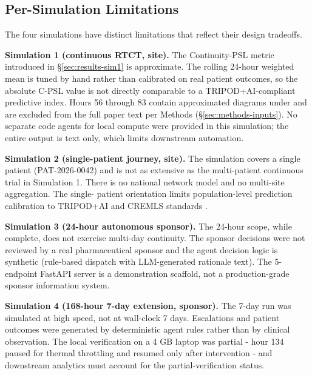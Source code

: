 
\subsection{Per-Simulation Limitations}
\label{sec:limits-per-sim}

The four simulations have distinct limitations that reflect their
design tradeoffs.

\textbf{Simulation 1 (continuous RTCT, site).} The Continuity-PSL
metric introduced in \S\ref{sec:results-sim1} is approximate. The
rolling 24-hour weighted mean is tuned by hand rather than calibrated
on real patient outcomes, so the absolute C-PSL value is not directly
comparable to a TRIPOD+AI-compliant predictive index. Hours 56
through 83 contain approximated diagrams under 
and are excluded from the full paper text per Methods
(\S\ref{sec:methods-inputs}). No separate code agents for local
compute were provided in this simulation; the entire output is text
only, which limits downstream automation.

\textbf{Simulation 2 (single-patient journey, site).} The simulation
covers a single patient (PAT-2026-0042) and is not as extensive as
the multi-patient continuous trial in Simulation 1. There is no
national network model and no multi-site aggregation. The single-
patient orientation limits population-level prediction calibration to
TRIPOD+AI and CREMLS standards \cite{Collins2024TRIPODAI,
ElEmam2024CREMLS}.

\textbf{Simulation 3 (24-hour autonomous sponsor).} The 24-hour
scope, while complete, does not exercise multi-day continuity. The
sponsor decisions were not reviewed by a real pharmaceutical sponsor
and the agent decision logic is synthetic (rule-based dispatch with
LLM-generated rationale text). The 5-endpoint FastAPI server is a
demonstration scaffold, not a production-grade sponsor information
system.

\textbf{Simulation 4 (168-hour 7-day extension, sponsor).} The 7-day
run was simulated at high speed, not at wall-clock 7 days. Escalations
and patient outcomes were generated by deterministic agent rules
rather than by clinical observation. The local verification on a 4 GB
laptop was partial - hour 134 paused for thermal throttling and
resumed only after intervention - and downstream analytics must
account for the partial-verification status.

